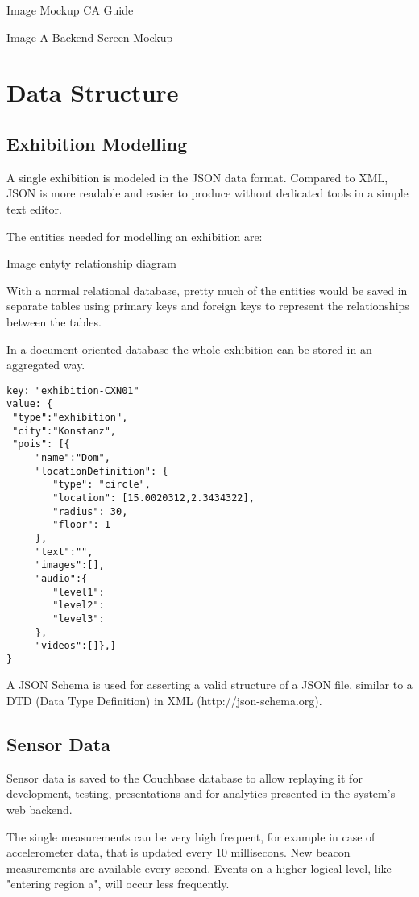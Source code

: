 Image Mockup CA Guide 

Image A Backend Screen Mockup

\section{Data Structure}

\subsection{Exhibition Modelling}

A single exhibition is modeled in the JSON data format. Compared to XML, JSON is more readable and easier to produce without dedicated tools in a simple text editor.

The entities needed for modelling an exhibition are:

Image entyty relationship diagram

With a normal relational database, pretty much of the entities would be saved in separate tables using primary keys and foreign keys to represent the relationships between the tables.

In a document-oriented database the whole exhibition can be stored in an aggregated way. 

\begin{lstlisting}
key: "exhibition-CXN01"
value: {
 "type":"exhibition",
 "city":"Konstanz",
 "pois": [{
	 "name":"Dom", 
	 "locationDefinition": {
	 	"type": "circle",
	 	"location": [15.0020312,2.3434322],
	 	"radius": 30,
	 	"floor": 1
	 }, 
	 "text":"", 
	 "images":[], 
	 "audio":{
	 	"level1":
	 	"level2":
	 	"level3":
	 }, 
	 "videos":[]},]
}
\end{lstlisting}

A JSON Schema is used for asserting a valid structure of a JSON file, similar to a DTD (Data Type Definition) in XML (http://json-schema.org).

\subsection{Sensor Data}

Sensor data is saved to the Couchbase database to allow replaying it for development, testing, presentations and for analytics presented in the system's web backend. 

The single measurements can be very high frequent, for example in case of accelerometer data, that is updated every 10 millisecons. New beacon measurements are available every second. Events on a higher logical level, like "entering region a", will occur less frequently.

